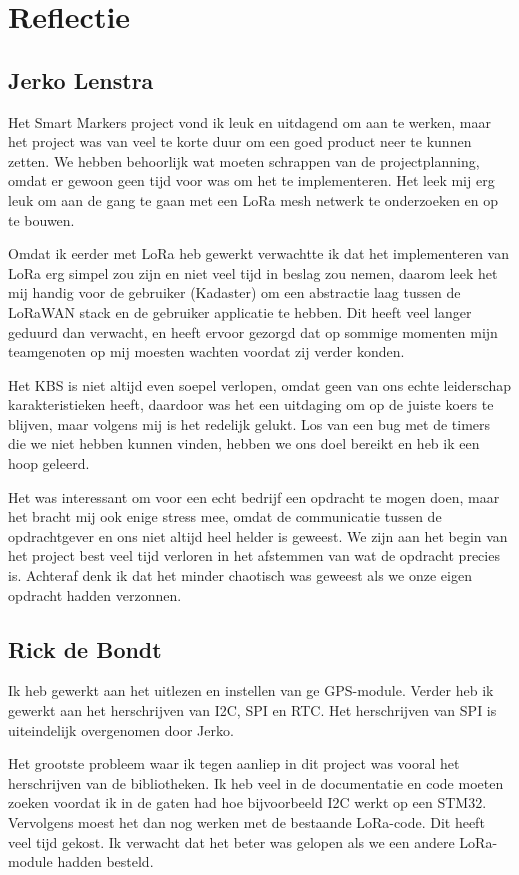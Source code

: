 \section{Reflectie}

\subsection{Jerko Lenstra}
Het Smart Markers project vond ik leuk en uitdagend om aan te werken, maar het
project was van veel te korte duur om een goed product neer te kunnen zetten.
We hebben behoorlijk wat moeten schrappen van de projectplanning, omdat er
gewoon geen tijd voor was om het te implementeren. Het leek mij erg leuk om aan
de gang te gaan met een LoRa mesh netwerk te onderzoeken en op te bouwen.

Omdat ik eerder met LoRa heb gewerkt verwachtte ik dat het implementeren van
LoRa erg simpel zou zijn en niet veel tijd in beslag zou nemen, daarom leek het
mij handig voor de gebruiker (Kadaster) om een abstractie laag tussen de LoRaWAN
stack en de gebruiker applicatie te hebben. Dit heeft veel langer geduurd dan
verwacht, en heeft ervoor gezorgd dat op sommige momenten mijn teamgenoten op
mij moesten wachten voordat zij verder konden.

Het KBS is niet altijd even soepel verlopen, omdat geen van ons echte
leiderschap karakteristieken heeft, daardoor was het een uitdaging om op de
juiste koers te blijven, maar volgens mij is het redelijk gelukt. Los van een
bug met de timers die we niet hebben kunnen vinden, hebben we ons doel bereikt
en heb ik een hoop geleerd.

Het was interessant om voor een echt bedrijf een opdracht te mogen doen, maar
het bracht mij ook enige stress mee, omdat de communicatie tussen de
opdrachtgever en ons niet altijd heel helder is geweest. We zijn aan het begin
van het project best veel tijd verloren in het afstemmen van wat de opdracht
precies is. Achteraf denk ik dat het minder chaotisch was geweest als we onze
eigen opdracht hadden verzonnen.

\subsection{Rick de Bondt}
Ik heb gewerkt aan het uitlezen en instellen van ge GPS-module. Verder heb ik
gewerkt aan het herschrijven van I2C, SPI en RTC. Het herschrijven van SPI is
uiteindelijk overgenomen door Jerko.

Het grootste probleem waar ik tegen aanliep in dit project was vooral het
herschrijven van de bibliotheken. Ik heb veel in de documentatie en code moeten
zoeken voordat ik in de gaten had hoe bijvoorbeeld I2C werkt op een STM32.
Vervolgens moest het dan nog werken met de bestaande LoRa-code. Dit heeft veel
tijd gekost. Ik verwacht dat het beter was gelopen als we een andere LoRa-module
hadden besteld.

